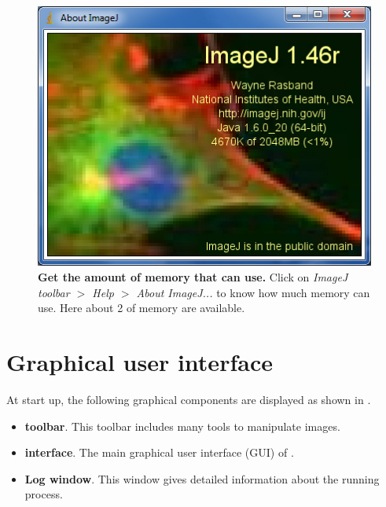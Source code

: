 \begin{figure}[!h]
\centering
\includegraphics[scale=0.5]{images/ij_memory_2.jpg}
\caption{\textbf{Get the amount of memory that \wingj can use.} Click on \textit{ImageJ toolbar $>$ Help $>$ About ImageJ...} to know how much memory \wingj can use. Here about 2 \GB of memory are available.}
\label{fig:ij_memory}
\end{figure}

\section{Graphical user interface}
At start up, the following graphical components are displayed as shown in .

\begin{itemize}
 \item \textbf{\ij toolbar}. This toolbar includes many tools to manipulate images.
 \item \textbf{\wingj interface}. The main graphical user interface (GUI) of \wingj.
 \item \textbf{Log window}. This window gives detailed information about the running process.
\end{itemize}


